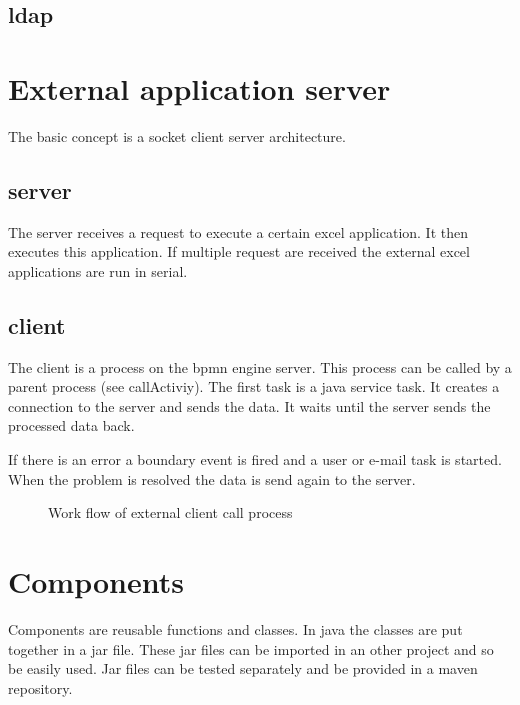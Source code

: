 \documentclass[paper=a4,twoside=false,BCOR=0mm,DIV=calc,fontsize=12pt]{scrartcl}
\begin{document}
\subsection{ldap}



\section{External application server}

The basic concept is a socket client server architecture. 

\subsection{server}

The server receives a request to execute a certain excel application. It then executes this application. If multiple request are received the external excel applications are run in serial.





\subsection{client}

The client is a process on the bpmn engine server. This process can be called by a parent process (see callActiviy). 
The first task is a java service task. It creates a connection to the server and sends the data. 
It waits until the server sends the processed data back.

If there is an error a boundary event is fired and a user or e-mail task is started. When the problem is resolved the 
data is send again to the server.


\begin{figure}
    \begin{center}
    \end{center}
  \caption{Work flow of external client call process}
  \label{externClientWorkflow}
\end{figure} 



\section{Components}
Components are reusable functions and classes. In java the classes are put together in a jar file. These jar files can be imported in an other project and so be easily used.
Jar files can be tested separately and be provided in a maven repository.
\end{document}
